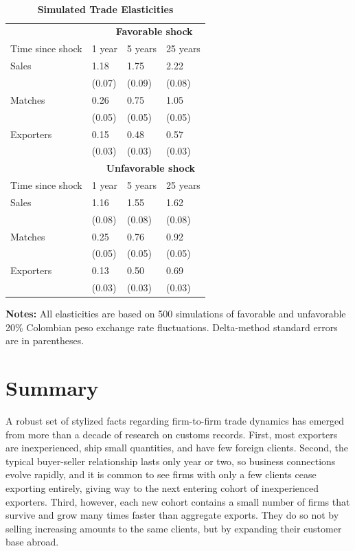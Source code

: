 \documentclass[12pt]{article}
\begin{document}
\begin{table}[tbp]
\caption{\textbf{Simulated Trade Elasticities}}
\label{tab:elasticities}\centering
{\small \ }
\par
{\small 
\begin{tabular}{llll}
\hline\hline
& \multicolumn{3}{l}{\ \ \ \ \ \textbf{Favorable shock}} \\ \cline{2-4}
Time since shock & 1 year & 5 years & 25 years \\ \hline
Sales & 1.18 & 1.75 & 2.22 \\ 
& (0.07) & (0.09) & (0.08) \\ 
Matches & 0.26 & 0.75 & 1.05 \\ 
& (0.05) & (0.05) & (0.05) \\ 
Exporters & 0.15 & 0.48 & 0.57 \\ 
& (0.03) & (0.03) & (0.03) \\ 
& \multicolumn{3}{l}{\ \ \ \textbf{Unfavorable shock}} \\ \cline{2-4}
Time since shock & 1 year & 5 years & 25 years \\ \hline
Sales & 1.16 & 1.55 & 1.62 \\ 
& (0.08) & (0.08) & (0.08) \\ 
Matches & 0.25 & 0.76 & 0.92 \\ 
& (0.05) & (0.05) & (0.05) \\ 
Exporters & 0.13 & 0.50 & 0.69 \\ 
& (0.03) & (0.03) & (0.03) \\ \hline
\end{tabular}
}
\par
{\endcenter
\begin{tablenotes}
\item \textbf{Notes:} All elasticities are based on 500 simulations of favorable and unfavorable 20\% Colombian peso exchange rate fluctuations.  Delta-method standard errors are in parentheses.
\end{tablenotes}
}
\end{table}

\pagebreak

\section{Summary}

A robust set of stylized facts regarding firm-to-firm trade dynamics has
emerged from more than a decade of research on customs records. First, most
exporters are inexperienced, ship small quantities, and have few foreign
clients. Second, the typical buyer-seller relationship lasts only year or
two, so business connections evolve rapidly, and it is common to see firms
with only a few clients cease exporting entirely, giving way to the next
entering cohort of inexperienced exporters. Third, however, each new cohort
contains a small number of firms that survive and grow many times faster
than aggregate exports. They do so not by selling increasing amounts to the
same clients, but by expanding their customer base abroad.
\end{document}
